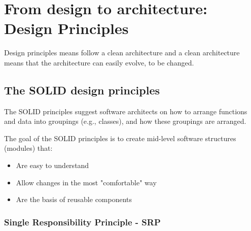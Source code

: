 \chapter{From design to architecture: Design Principles}

Design principles means follow a clean architecture and a clean architecture means that the
architecture can easily evolve, to be changed.

\section{The SOLID design principles}
The SOLID principles suggest software architects on how to arrange
functions and data into groupings (e.g., classes), and how these
groupings are arranged.

The goal of the SOLID principles is to create mid-level software structures
(modules) that:

\begin{itemize}
  \setlength{\itemsep}{0pt}
  \item Are easy to understand
  \item Allow changes in the most "comfortable" way
  \item Are the basis of reusable components
\end{itemize}

\subsection{Single Responsibility Principle - SRP}


